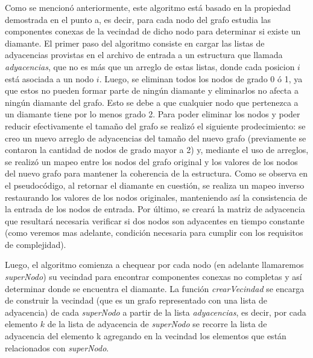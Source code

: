 \documentclass[a4paper,11pt] {article}
\begin{document}
Como se mencion\'o anteriormente, este algoritmo est\'a basado en la propiedad demostrada en el punto a, es decir, para cada nodo del grafo estudia las componentes conexas de la vecindad de dicho nodo para determinar si existe un diamante. 
El primer paso del algoritmo consiste en cargar las listas de adyacencias provistas en el archivo de entrada a un estructura que llamada \textit{adyacencias}, que no es más que un arreglo de estas listas, donde cada posicion $i$ está asociada a un nodo $i$. Luego, se eliminan todos los nodos de grado 0 \'o 1, ya que estos no pueden formar parte de ning\'un diamante y eliminarlos no afecta a ning\'un diamante del grafo. Esto se debe a que cualquier nodo que pertenezca a un diamante tiene por lo menos grado 2. Para poder eliminar los nodos y poder reducir efectivamente el tamaño del grafo se realizó el siguiente prodecimiento: se creo un nuevo arreglo de adyacencias del tamaño del nuevo grafo (previamente se contaron la cantidad de nodos de grado mayor a 2) y, mediante el uso de arreglos, se realizó un mapeo entre los nodos del grafo original y los valores de los nodos del nuevo grafo para mantener la coherencia de la estructura. Como se observa en el pseudocódigo, al retornar el diamante en cuestión, se realiza un mapeo inverso restaurando los valores de los nodos originales, manteniendo así la consistencia de la entrada de los nodos de entrada. Por último, se creará la matriz de adyacencia que resultar\'a necesaria verificar si dos nodos son adyacentes en tiempo constante (como veremos mas adelante, condición necesaria para cumplir con los requisitos de complejidad).

Luego, el algoritmo comienza a chequear por cada nodo (en adelante llamaremos \textit{superNodo}) su vecindad para encontrar componentes conexas no completas y as\'i determinar donde se encuentra el diamante. La funci\'on \textit{crearVecindad} se encarga de construir la vecindad (que es un grafo representado con una lista de adyacencia) de cada \textit{superNodo} a partir de la lista \textit{adyacencias}, es decir, por cada elemento $k$ de la lista de adyacencia de \textit{superNodo} se recorre la lista de adyacencia del elemento k agregando en la vecindad los elementos que est\'an relacionados con \textit{superNodo}.
\end{document}
